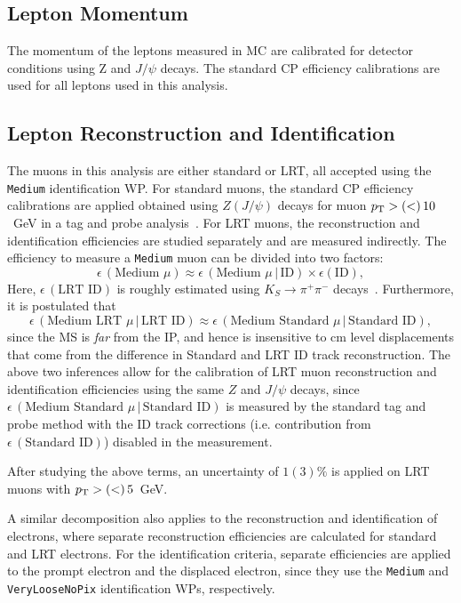 \subsection*{Lepton Momentum}
The momentum of the leptons measured in MC are calibrated for detector conditions using Z and $J/\psi$ decays. The standard CP efficiency calibrations are used for all leptons used in this analysis.

\subsection*{Lepton Reconstruction and Identification}
The muons in this analysis are either standard or LRT, all accepted using the \texttt{Medium} identification WP. For standard muons, the standard CP efficiency calibrations are applied obtained using $Z(J/\psi)$ decays for muon $p_\mathrm{T} >(<)\,10$~GeV in a tag and probe analysis~\cite{MUON-2018-03}. 
For LRT muons, the reconstruction and identification efficiencies are studied separately and are measured indirectly. The efficiency to measure a \texttt{Medium} muon can be divided into two factors:
\begin{equation}
    \epsilon\, (\text{Medium }\mu) \approx \epsilon\, (\text{Medium }\mu \,|\,\mathrm{ID}) \times \epsilon (\mathrm{ID}),
\end{equation}
Here, $\epsilon\, (\text{LRT ID})$ is roughly estimated using $K_S\to\pi^+\pi^-$ decays~\cite{IDTR-2021-03}. Furthermore, it is postulated that
\begin{equation}
    \epsilon\, (\text{Medium LRT }\mu \,|\,\text{LRT ID})\approx\epsilon\, (\text{Medium Standard }\mu \,|\,\text{Standard ID}),
\end{equation}
since the MS is \textit{far} from the IP, and hence is insensitive to cm level displacements that come from the difference in Standard and LRT ID track reconstruction. The above two inferences allow for the calibration of LRT muon reconstruction and identification efficiencies using the same $Z$ and $J/\psi$ decays, since $\epsilon\, (\text{Medium Standard }\mu \,|\,\text{Standard ID})$ is measured by the standard tag and probe method with the ID track corrections (i.e. contribution from $\epsilon\, (\text{Standard ID})$) disabled in the measurement.

After studying the above terms, an uncertainty of $1(3)\%$ is applied on LRT muons with $p_\mathrm{T} >(<)\,5$~GeV.

A similar decomposition also applies to the reconstruction and identification of electrons, where separate reconstruction efficiencies are calculated for standard and LRT electrons. For the identification criteria, separate efficiencies are applied to the prompt electron and the displaced electron, since they use the \texttt{Medium} and \texttt{VeryLooseNoPix} identification WPs, respectively.

